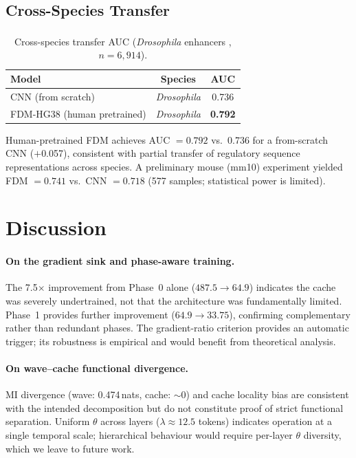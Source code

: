 \documentclass{article}
\newcommand{\citenum}[1]{%
  \textsuperscript{\rmfamily\upshape[#1]}}
\begin{document}
\subsection{Cross-Species Transfer}

\begin{table}[h]
\centering
\caption{Cross-species transfer AUC (\emph{Drosophila} enhancers\citenum{20},
$n = 6{,}914$).}
\label{tab:cross}
\begin{tabular}{lcc}
\toprule
Model & Species & AUC \\
\midrule
CNN (from scratch)           & \emph{Drosophila} & 0.736 \\
FDM-HG38 (human pretrained)  & \emph{Drosophila} & \textbf{0.792} \\
\bottomrule
\end{tabular}
\end{table}

Human-pretrained FDM achieves AUC $= 0.792$ vs.\ 0.736 for a
from-scratch CNN ($+$0.057), consistent with partial transfer of
regulatory sequence representations across species.
A preliminary mouse (mm10) experiment yielded FDM $= 0.741$
vs.\ CNN $= 0.718$ (577 samples; statistical power is limited).

\section{Discussion}
\label{sec:discussion}

\paragraph{On the gradient sink and phase-aware training.}
The 7.5$\times$ improvement from Phase~0 alone ($487.5 \to 64.9$)
indicates the cache was severely undertrained, not that the architecture
was fundamentally limited.
Phase~1 provides further improvement ($64.9 \to 33.75$), confirming
complementary rather than redundant phases.
The gradient-ratio criterion provides an automatic trigger; its
robustness is empirical and would benefit from theoretical analysis.

\paragraph{On wave--cache functional divergence.}
MI divergence (wave: 0.474\,nats, cache: $\sim$0) and cache locality
bias are consistent with the intended decomposition but do not constitute
proof of strict functional separation.
Uniform $\theta$ across layers ($\lambda \approx 12.5$ tokens) indicates
operation at a single temporal scale; hierarchical behaviour would
require per-layer $\theta$ diversity, which we leave to future work.
\end{document}
